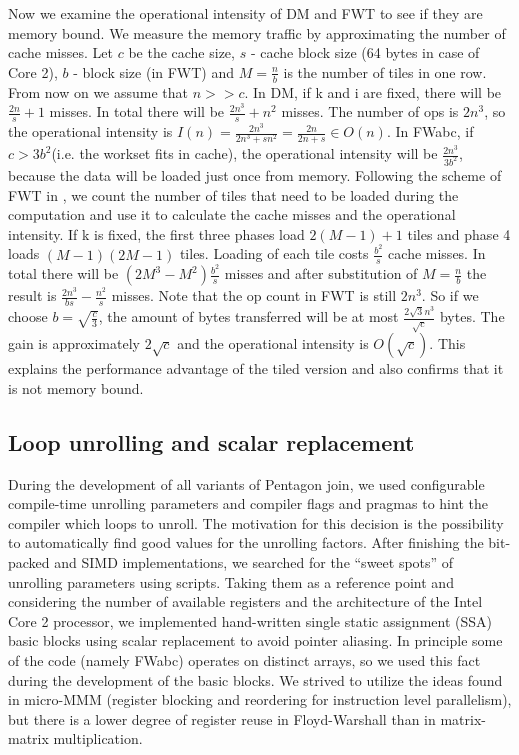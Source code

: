 \documentclass[letterpaper]{article}
\begin{document}
Now we examine the operational intensity of DM and FWT to see if they are memory bound.
We measure the memory traffic by approximating the number of cache misses. Let $c$ be the cache size, $s$ - cache block size (64 bytes in case of Core 2), 
$b$ - block size (in FWT) and $M=\frac{n}{b}$ is the number of tiles in one row.
From now on we assume that $n>>c$. In DM, if k and i are fixed, there will be $\frac{2n}{s}+1$ misses. In total there will be $\frac{2n^3}{s}+n^2$ misses.
The number of ops is $2n^3$, so the operational intensity is $I(n) = \frac{2n^3}{2n^3+sn^2} = \frac{2n}{2n+s} \in O(n)$.
In FWabc, if $c>3b^2$(i.e. the workset fits in cache), the operational intensity will be $\frac{2n^3}{3b^2}$, because the data will be loaded just once from memory.
Following the scheme of FWT in \cite{Pueschel2006}, we count the number of tiles that need to be loaded during the computation and use it to calculate the cache misses and
the operational intensity. If k is fixed, the first three phases load $2(M-1)+1$ tiles and phase 4 loads $(M-1)(2M-1)$ tiles. Loading of each tile costs $\frac{b^2}{s}$ cache
misses. In total there will be $(2M^3-M^2)\frac{b^2}{s}$ misses and after substitution of $M=\frac{n}{b}$ the result is $\frac{2n^3}{bs}-\frac{n^2}{s}$ misses. Note that the op count
in FWT is still $2n^3$. So if we choose $b=\sqrt{\frac{c}{3}}$, the amount of bytes transferred will be at most $\frac{2\sqrt{3}n^3}{\sqrt{c}}$ bytes. The gain is approximately 
$2\sqrt{c}$ and the operational intensity is $O(\sqrt{c})$. This explains the performance advantage of the tiled version and also confirms that it is not memory bound.

\subsection{Loop unrolling and scalar replacement}
During the development of all variants of Pentagon join, we used configurable 
compile-time unrolling parameters and compiler flags and pragmas to hint 
the compiler which loops to unroll. The motivation for this decision is 
the possibility to automatically find good values for the unrolling factors. 
After finishing the bit-packed and SIMD implementations, we searched for 
the ``sweet spots'' of unrolling parameters using scripts. Taking them as a 
reference point and considering the number of available registers and the architecture of the Intel Core 2 processor, 
we implemented hand-written single static assignment (SSA) basic blocks using 
scalar replacement to avoid pointer aliasing. In principle some of the code (namely FWabc) 
operates on distinct arrays, so we used this fact during the development of the basic blocks. 
We strived to utilize the ideas found in micro-MMM (register blocking and reordering 
for instruction level parallelism), but there is a lower degree of register reuse in Floyd-Warshall than in matrix-matrix multiplication.
\end{document}

